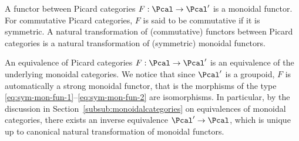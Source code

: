 A functor between Picard categories $F: \Pcal \to \Pcal'$ is a monoidal functor. For commutative Picard categories, $F$ is said to be commutative if it is symmetric. A natural transformation of (commutative) functors between Picard categories is a natural transformation of (symmetric) monoidal functors.

An equivalence of Picard categories $F: \Pcal \to \Pcal'$ is an equivalence of the underlying monoidal categories. We notice that since $\Pcal^{\prime}$ is a groupoid, $F$ is automatically a strong monoidal functor, that is the morphisms of the type \eqref{eq:sym-mon-fun-1}--\eqref{eq:sym-mon-fun-2} are isomorphisms. In particular, by the discussion in Section~\ref{subsub:monoidalcategories} on equivalences of monoidal categories, there exists an inverse equivalence $\Pcal^{\prime}\to\Pcal$, which is unique up to canonical natural transformation of monoidal functors.

